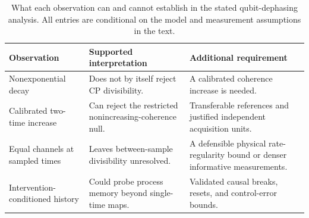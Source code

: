 \documentclass[11pt]{article}
\begin{document}
\begin{table}[!htbp]
\centering\small
\caption{What each observation can and cannot establish in the stated qubit-dephasing analysis. All entries are conditional on the model and measurement assumptions in the text.}
\begin{tabular}{@{}>{\raggedright\arraybackslash}p{}>{\raggedright\arraybackslash}p{}>{\raggedright\arraybackslash}p{}@{}}
\toprule
\textbf{Observation} & \textbf{Supported interpretation} & \textbf{Additional requirement}\\
\midrule
Nonexponential decay & Does not by itself reject CP divisibility. & A calibrated coherence increase is needed.\\
Calibrated two-time increase & Can reject the restricted nonincreasing-coherence null. & Transferable references and justified independent acquisition units.\\
Equal channels at sampled times & Leaves between-sample divisibility unresolved. & A defensible physical rate-regularity bound or denser informative measurements.\\
Intervention-conditioned history & Could probe process memory beyond single-time maps. & Validated causal breaks, resets, and control-error bounds.\\
\bottomrule
\end{tabular}
\par{}
\end{table}
\end{document}
